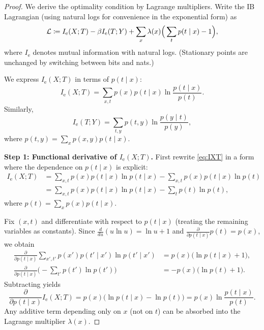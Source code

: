 \documentclass{article}
\numberwithin{equation}{section}
\newcommand{\cL}{{\cal L}}
\begin{document}
\begin{proof}
We derive the optimality condition by Lagrange multipliers.
Write the IB Lagrangian (using natural logs for convenience in the exponential form) as
\begin{equation}
\label{eq:ib-L}
    \cL \coloneqq I_{\mathrm{e}}(X;T) - \beta I_{\mathrm{e}}(T;Y) + \sum_x \lambda(x)\Big(\sum_t p(t\mid x)-1\Big),
\end{equation}
where $I_{\mathrm{e}}$ denotes mutual information with natural logs.
(Stationary points are unchanged by switching between bits and nats.)

We express $I_{\mathrm{e}}(X;T)$ in terms of $p(t\mid x)$:
\begin{equation}
\label{eq:IXT}
    I_{\mathrm{e}}(X;T) = \sum_{x,t} p(x)p(t\mid x)\ln\frac{p(t\mid x)}{p(t)}.
\end{equation}
Similarly,
\begin{equation}
\label{eq:ITY}
    I_{\mathrm{e}}(T;Y) = \sum_{t,y} p(t,y)\ln\frac{p(y\mid t)}{p(y)},
\end{equation}
where $p(t,y)=\sum_x p(x,y)p(t\mid x)$.

\textbf{Step 1: Functional derivative of $I_{\mathrm{e}}(X;T)$.}
First rewrite \eqref{eq:IXT} in a form where the dependence on $p(t\mid x)$ is explicit:
\begin{align}
    I_{\mathrm{e}}(X;T)
    &= \sum_{x,t} p(x)p(t\mid x)\ln p(t\mid x)
       - \sum_{x,t} p(x)p(t\mid x)\ln p(t)\\
    &= \sum_{x,t} p(x)p(t\mid x)\ln p(t\mid x)
       - \sum_t p(t)\ln p(t),
\end{align}
where $p(t)=\sum_x p(x)p(t\mid x)$.

Fix $(x,t)$ and differentiate with respect to $p(t\mid x)$ (treating the remaining variables as constants).
Since $\frac{d}{du}(u\ln u)=\ln u+1$ and $\frac{\partial}{\partial p(t\mid x)}p(t)=p(x)$, we obtain
\begin{align}
    \frac{\partial}{\partial p(t\mid x)}\sum_{x',t'} p(x')p(t'\mid x')\ln p(t'\mid x')
    &= p(x)\big(\ln p(t\mid x)+1\big),\\
    \frac{\partial}{\partial p(t\mid x)}\Big(-\sum_{t'} p(t')\ln p(t')\Big)
    &= -p(x)\big(\ln p(t)+1\big).
\end{align}
Subtracting yields
\begin{equation}
\label{eq:var-IXT}
    \frac{\partial}{\partial p(t\mid x)} I_{\mathrm{e}}(X;T)
    = p(x)\Big(\ln p(t\mid x) - \ln p(t)\Big)
    = p(x)\ln\frac{p(t\mid x)}{p(t)}.
\end{equation}
Any additive term depending only on $x$ (not on $t$) can be absorbed into the Lagrange multiplier $\lambda(x)$.


\end{proof}
\end{document}
